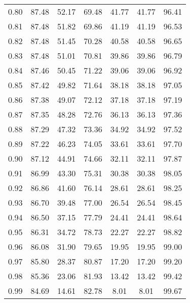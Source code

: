 \begin{tabular}{|c|c|c|c|c|c|c|}
      0.80 &     87.48 &     52.17 &      69.48 &   41.77 &      41.77 &         96.41 \\
      0.81 &     87.48 &     51.82 &      69.86 &   41.19 &      41.19 &         96.53 \\
      0.82 &     87.48 &     51.45 &      70.28 &   40.58 &      40.58 &         96.65 \\
      0.83 &     87.48 &     51.01 &      70.81 &   39.86 &      39.86 &         96.79 \\
      0.84 &     87.46 &     50.45 &      71.22 &   39.06 &      39.06 &         96.92 \\
      0.85 &     87.42 &     49.82 &      71.64 &   38.18 &      38.18 &         97.05 \\
      0.86 &     87.38 &     49.07 &      72.12 &   37.18 &      37.18 &         97.19 \\
      0.87 &     87.35 &     48.28 &      72.76 &   36.13 &      36.13 &         97.36 \\
      0.88 &     87.29 &     47.32 &      73.36 &   34.92 &      34.92 &         97.52 \\
      0.89 &     87.22 &     46.23 &      74.05 &   33.61 &      33.61 &         97.70 \\
      0.90 &     87.12 &     44.91 &      74.66 &   32.11 &      32.11 &         97.87 \\
      0.91 &     86.99 &     43.30 &      75.31 &   30.38 &      30.38 &         98.05 \\
      0.92 &     86.86 &     41.60 &      76.14 &   28.61 &      28.61 &         98.25 \\
      0.93 &     86.70 &     39.48 &      77.00 &   26.54 &      26.54 &         98.45 \\
      0.94 &     86.50 &     37.15 &      77.79 &   24.41 &      24.41 &         98.64 \\
      0.95 &     86.31 &     34.72 &      78.73 &   22.27 &      22.27 &         98.82 \\
      0.96 &     86.08 &     31.90 &      79.65 &   19.95 &      19.95 &         99.00 \\
      0.97 &     85.80 &     28.37 &      80.87 &   17.20 &      17.20 &         99.20 \\
      0.98 &     85.36 &     23.06 &      81.93 &   13.42 &      13.42 &         99.42 \\
      0.99 &     84.69 &     14.61 &      82.78 &    8.01 &       8.01 &         99.67 \\
\bottomrule
\end{tabular}
